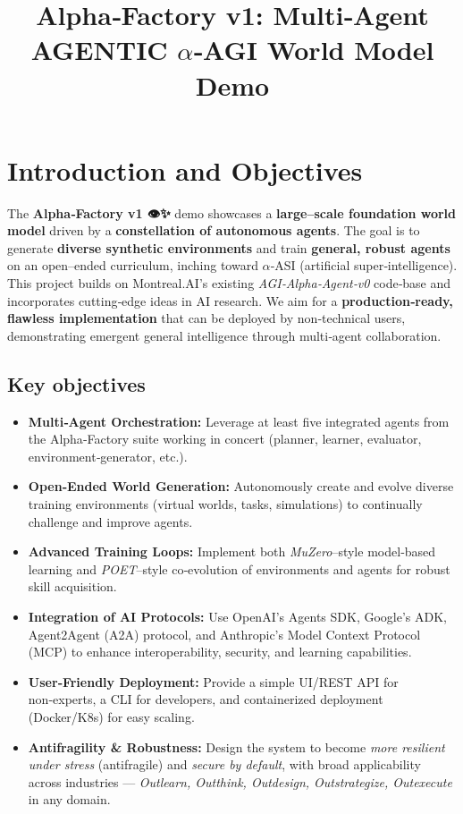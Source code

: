 \documentclass{article}
\begin{document}
\title{\textbf{Alpha‑Factory v1: Multi‑Agent AGENTIC $\alpha$‑AGI World Model Demo}}
\date{}
\maketitle

\section*{Introduction and Objectives}

The \textbf{Alpha‑Factory v1 👁️✨} demo showcases a \textbf{large--scale foundation world model} driven by a \textbf{constellation of autonomous agents}. 
The goal is to generate \textbf{diverse synthetic environments} and train \textbf{general, robust agents} on an open--ended curriculum, inching toward $\alpha$‑ASI (artificial super‑intelligence). 
This project builds on Montreal.AI's existing \textit{AGI‑Alpha‑Agent‑v0} code‑base and incorporates cutting‑edge ideas in AI research. 
We aim for a \textbf{production‑ready, flawless implementation} that can be deployed by non‑technical users, demonstrating emergent general intelligence through multi‑agent collaboration.

\subsection*{Key objectives}

\begin{itemize}[leftmargin=*]
  \item \textbf{Multi‑Agent Orchestration:} Leverage at least five integrated agents from the Alpha‑Factory suite working in concert (planner, learner, evaluator, environment‑generator, etc.).
  \item \textbf{Open‑Ended World Generation:} Autonomously create and evolve diverse training environments (virtual worlds, tasks, simulations) to continually challenge and improve agents.
  \item \textbf{Advanced Training Loops:} Implement both \textit{MuZero}--style model‑based learning and \textit{POET}--style co‑evolution of environments and agents for robust skill acquisition.
  \item \textbf{Integration of AI Protocols:} Use OpenAI's Agents SDK, Google's ADK, Agent2Agent (A2A) protocol, and Anthropic's Model Context Protocol (MCP) to enhance interoperability, security, and learning capabilities.
  \item \textbf{User‑Friendly Deployment:} Provide a simple UI/REST API for non‑experts, a CLI for developers, and containerized deployment (Docker/K8s) for easy scaling.
  \item \textbf{Antifragility \& Robustness:} Design the system to become \textit{more resilient under stress} (antifragile) and \textit{secure by default}, with broad applicability across industries --- \textit{Outlearn, Outthink, Outdesign, Outstrategize, Outexecute} in any domain.
\end{itemize}
\end{document}

